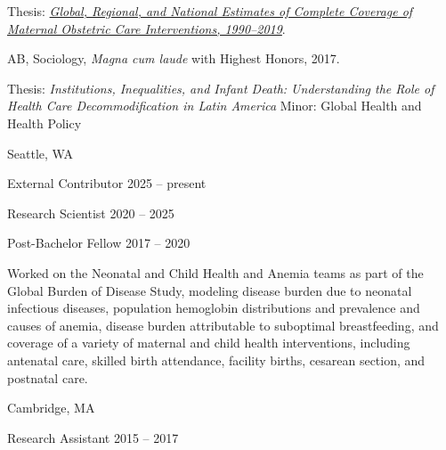 \documentclass[11pt,article,oneside]{memoir}
\begin{document}
\ind \hspace{0.35in} \footnotesize Thesis: \href{https://www.proquest.com/openview/e41ccfd9cef6b7376c1218dc0080b575/1?pq-origsite=gscholar&cbl=18750&diss=y}{\emph{Global, Regional, and National Estimates of Complete Coverage of Maternal \newline Obstetric Care
	Interventions, 1990--2019}}.\normalsize 

\medskip
{}

\ind AB, Sociology, \emph{Magna cum laude} with Highest Honors, 2017.

\ind \hspace{0.35in} \footnotesize Thesis: \emph{Institutions, Inequalities, and Infant Death: Understanding the Role of Health Care \newline
Decommodification in Latin America} \newline Minor: Global Health and Health Policy \normalsize \vspace{0.01in}

\bigskip


 \hfill Seattle, WA

\ind External Contributor \hfill 2025 -- present

\ind Research Scientist \hfill 2020 -- 2025

\ind Post-Bachelor Fellow\vspace{0.02in} \hfill 2017 -- 2020

{\noindent \footnotesize Worked on the Neonatal and Child Health and Anemia teams as part of the Global Burden of Disease Study, modeling disease
burden due to neonatal infectious diseases, population hemoglobin distributions and prevalence and causes of anemia, disease burden attributable
to suboptimal breastfeeding, and coverage of a variety of maternal and child health interventions, including antenatal care, skilled birth attendance,
facility births, cesarean section, and postnatal care.} 

\bigskip

 \hfill Cambridge, MA

\ind Research Assistant\vspace{0.02in} \hfill 2015 -- 2017
\end{document}
